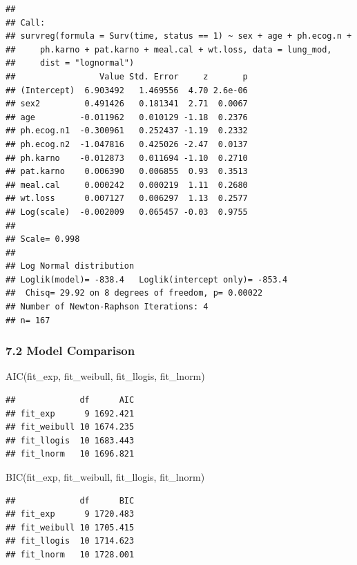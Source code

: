 \documentclass[
]{article}
\newenvironment{Shaded}{\begin{snugshade}}{\end{snugshade}}
\newcommand{\FunctionTok}[1]{\textcolor[rgb]{0.00,0.00,0.00}{#1}}
\newcommand{\NormalTok}[1]{#1}
\begin{document}
\begin{verbatim}
## 
## Call:
## survreg(formula = Surv(time, status == 1) ~ sex + age + ph.ecog.n + 
##     ph.karno + pat.karno + meal.cal + wt.loss, data = lung_mod, 
##     dist = "lognormal")
##                 Value Std. Error     z       p
## (Intercept)  6.903492   1.469556  4.70 2.6e-06
## sex2         0.491426   0.181341  2.71  0.0067
## age         -0.011962   0.010129 -1.18  0.2376
## ph.ecog.n1  -0.300961   0.252437 -1.19  0.2332
## ph.ecog.n2  -1.047816   0.425026 -2.47  0.0137
## ph.karno    -0.012873   0.011694 -1.10  0.2710
## pat.karno    0.006390   0.006855  0.93  0.3513
## meal.cal     0.000242   0.000219  1.11  0.2680
## wt.loss      0.007127   0.006297  1.13  0.2577
## Log(scale)  -0.002009   0.065457 -0.03  0.9755
## 
## Scale= 0.998 
## 
## Log Normal distribution
## Loglik(model)= -838.4   Loglik(intercept only)= -853.4
##  Chisq= 29.92 on 8 degrees of freedom, p= 0.00022 
## Number of Newton-Raphson Iterations: 4 
## n= 167
\end{verbatim}

\hypertarget{model-comparison-1}{%
\subsubsection{7.2 Model Comparison}\label{model-comparison-1}}

\begin{Shaded}
\begin{Highlighting}[]
\FunctionTok{AIC}\NormalTok{(fit\_exp, fit\_weibull, fit\_llogis, fit\_lnorm)}
\end{Highlighting}
\end{Shaded}

\begin{verbatim}
##             df      AIC
## fit_exp      9 1692.421
## fit_weibull 10 1674.235
## fit_llogis  10 1683.443
## fit_lnorm   10 1696.821
\end{verbatim}

\begin{Shaded}
\begin{Highlighting}[]
\FunctionTok{BIC}\NormalTok{(fit\_exp, fit\_weibull, fit\_llogis, fit\_lnorm)}
\end{Highlighting}
\end{Shaded}

\begin{verbatim}
##             df      BIC
## fit_exp      9 1720.483
## fit_weibull 10 1705.415
## fit_llogis  10 1714.623
## fit_lnorm   10 1728.001
\end{verbatim}
\end{document}
